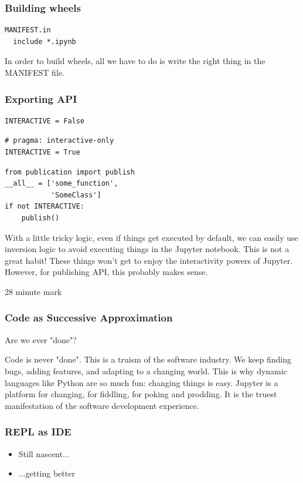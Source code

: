 \begin{frame}[fragile]
\frametitle{Building wheels}

\begin{lstlisting}
MANIFEST.in
  include *.ipynb
\end{lstlisting}

\end{frame}

In order to build wheels,
all we have to do is write the right thing in the MANIFEST file.

\begin{frame}[fragile]
\frametitle{Exporting API}

\begin{lstlisting}[frame=single]
INTERACTIVE = False
\end{lstlisting}

\begin{lstlisting}[frame=single]
# pragma: interactive-only 
INTERACTIVE = True
\end{lstlisting}

\begin{lstlisting}[frame=single]
from publication import publish
__all__ = ['some_function',
           'SomeClass']
if not INTERACTIVE:
    publish()
\end{lstlisting}

\end{frame}

With a little tricky logic,
even if things get executed by default,
we can easily use inversion logic to avoid executing things
in the Jupyter notebook.
This is not a great habit!
These things won't get to enjoy the interactivity powers of Jupyter.
However,
for publishing API,
this probably makes sense.

28 minute mark

\begin{frame}
\frametitle{Code as Successive Approximation}

Are we ever "done"?

\end{frame}

Code is never "done".
This is a truism of the software industry.
We keep finding bugs,
adding features,
and adapting to a changing world.
This is why dynamic languages like Python are so much fun:
changing things is easy.
Jupyter is a platform for changing,
for fiddling,
for poking and prodding.
It is the truest manifestation of the software development experience.

\begin{frame}
\frametitle{REPL as IDE}

\begin{itemize}
\item Still nascent...
\item ...getting better
\end{itemize}

\end{frame}

